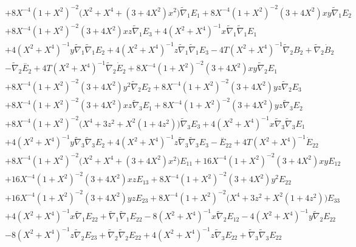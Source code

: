 \documentclass[10pt,letterpaper]{article}
\numberwithin{equation}{section}
\begin{document}
\begin{appendices}
\begin{eqnarray}
&& + 8 X^{-4} (1 + X^2)^{-2} \bigl(X^2 + X^4 + (3 + 4 X^2) x^2\bigr) \tilde{\nabla}_{1}E_{1} + 8 X^{-4} (1 + X^2)^{-2} (3 + 4 X^2) x y \tilde{\nabla}_{1}E_{2} \nonumber \\ 
&& + 8 X^{-4} (1 + X^2)^{-2} (3 + 4 X^2) x z \tilde{\nabla}_{1}E_{3} + 4 (X^2 + X^4)^{-1} x \tilde{\nabla}_{1}\tilde{\nabla}_{1}E_{1} \nonumber \\ 
&& + 4 (X^2 + X^4)^{-1} y \tilde{\nabla}_{1}\tilde{\nabla}_{1}E_{2} + 4 (X^2 + X^4)^{-1} z \tilde{\nabla}_{1}\tilde{\nabla}_{1}E_{3} - 4 T (X^2 + X^4)^{-1} \tilde{\nabla}_{2}B_{2} + \tilde{\nabla}_{2}\dot{B}_{2} \nonumber \\ 
&& -  \tilde{\nabla}_{2}\overset{..}{E}_{2} + 4 T (X^2 + X^4)^{-1} \tilde{\nabla}_{2}\dot{E}_{2} + 8 X^{-4} (1 + X^2)^{-2} (3 + 4 X^2) x y \tilde{\nabla}_{2}E_{1} \nonumber \\ 
&& + 8 X^{-4} (1 + X^2)^{-2} (3 + 4 X^2) y^2 \tilde{\nabla}_{2}E_{2} + 8 X^{-4} (1 + X^2)^{-2} (3 + 4 X^2) y z \tilde{\nabla}_{2}E_{3} \nonumber \\ 
&& + 8 X^{-4} (1 + X^2)^{-2} (3 + 4 X^2) x z \tilde{\nabla}_{3}E_{1} + 8 X^{-4} (1 + X^2)^{-2} (3 + 4 X^2) y z \tilde{\nabla}_{3}E_{2} \nonumber \\ 
&& + 8 X^{-4} (1 + X^2)^{-2} \bigl(X^4 + 3 z^2 + X^2 (1 + 4 z^2)\bigr) \tilde{\nabla}_{3}E_{3} + 4 (X^2 + X^4)^{-1} x \tilde{\nabla}_{3}\tilde{\nabla}_{3}E_{1} \nonumber \\ 
&& + 4 (X^2 + X^4)^{-1} y \tilde{\nabla}_{3}\tilde{\nabla}_{3}E_{2} + 4 (X^2 + X^4)^{-1} z \tilde{\nabla}_{3}\tilde{\nabla}_{3}E_{3}- \overset{..}{E}_{22} + 4 T (X^2 + X^4)^{-1} \dot{E}_{22} \nonumber \\ 
&& + 8 X^{-4} (1 + X^2)^{-2} \bigl(X^2 + X^4 + (3 + 4 X^2) x^2\bigr) E_{11} + 16 X^{-4} (1 + X^2)^{-2} (3 + 4 X^2) x y E_{12} \nonumber \\ 
&& + 16 X^{-4} (1 + X^2)^{-2} (3 + 4 X^2) x z E_{13} + 8 X^{-4} (1 + X^2)^{-2} (3 + 4 X^2) y^2 E_{22} \nonumber \\ 
&& + 16 X^{-4} (1 + X^2)^{-2} (3 + 4 X^2) y z E_{23} + 8 X^{-4} (1 + X^2)^{-2} \bigl(X^4 + 3 z^2 + X^2 (1 + 4 z^2)\bigr) E_{33} \nonumber \\ 
&& + 4 (X^2 + X^4)^{-1} x \tilde{\nabla}_{1}E_{22} + \tilde{\nabla}_{1}\tilde{\nabla}_{1}E_{22} - 8 (X^2 + X^4)^{-1} x \tilde{\nabla}_{2}E_{12} - 4 (X^2 + X^4)^{-1} y \tilde{\nabla}_{2}E_{22} \nonumber \\ 
&& - 8 (X^2 + X^4)^{-1} z \tilde{\nabla}_{2}E_{23} + \tilde{\nabla}_{2}\tilde{\nabla}_{2}E_{22} + 4 (X^2 + X^4)^{-1} z \tilde{\nabla}_{3}E_{22} + \tilde{\nabla}_{3}\tilde{\nabla}_{3}E_{22}

\end{eqnarray}
\end{appendices}
\end{document}
